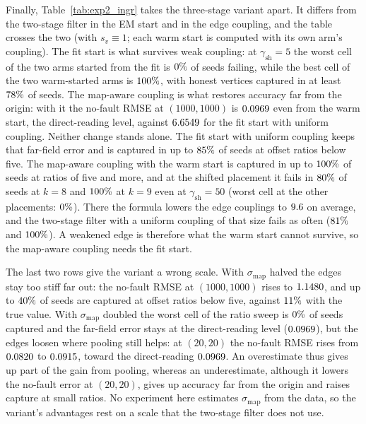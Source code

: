 \documentclass[11pt,a4paper]{article}
\theoremstyle{definition}
\theoremstyle{remark}
\begin{document}
Finally, Table~\ref{tab:exp2_ingr} takes the three-stage variant apart. It differs from the two-stage filter in the EM start and in the edge coupling, and the table crosses the two (with $s_v \equiv 1$; each warm start is computed with its own arm's coupling). The fit start is what survives weak coupling: at $\gamma_{\mathrm{sh}} = 5$ the worst cell of the two arms started from the fit is $0\%$ of seeds failing, while the best cell of the two warm-started arms is $100\%$, with honest vertices captured in at least $78\%$ of seeds. The map-aware coupling is what restores accuracy far from the origin: with it the no-fault RMSE at $(1000,1000)$ is $0.0969$ even from the warm start, the direct-reading level, against $6.6549$ for the fit start with uniform coupling. Neither change stands alone. The fit start with uniform coupling keeps that far-field error and is captured in up to $85\%$ of seeds at offset ratios below five. The map-aware coupling with the warm start is captured in up to $100\%$ of seeds at ratios of five and more, and at the shifted placement it fails in $80\%$ of seeds at $k = 8$ and $100\%$ at $k = 9$ even at $\gamma_{\mathrm{sh}} = 50$ (worst cell at the other placements: $0\%$). There the formula lowers the edge couplings to $9.6$ on average, and the two-stage filter with a uniform coupling of that size fails as often ($81\%$ and $100\%$). A weakened edge is therefore what the warm start cannot survive, so the map-aware coupling needs the fit start.

The last two rows give the variant a wrong scale. With $\sigma_{\mathrm{map}}$ halved the edges stay too stiff far out: the no-fault RMSE at $(1000,1000)$ rises to $1.1480$, and up to $40\%$ of seeds are captured at offset ratios below five, against $11\%$ with the true value. With $\sigma_{\mathrm{map}}$ doubled the worst cell of the ratio sweep is $0\%$ of seeds captured and the far-field error stays at the direct-reading level ($0.0969$), but the edges loosen where pooling still helps: at $(20,20)$ the no-fault RMSE rises from $0.0820$ to $0.0915$, toward the direct-reading $0.0969$. An overestimate thus gives up part of the gain from pooling, whereas an underestimate, although it lowers the no-fault error at $(20,20)$, gives up accuracy far from the origin and raises capture at small ratios. No experiment here estimates $\sigma_{\mathrm{map}}$ from the data, so the variant's advantages rest on a scale that the two-stage filter does not use.
\end{document}
